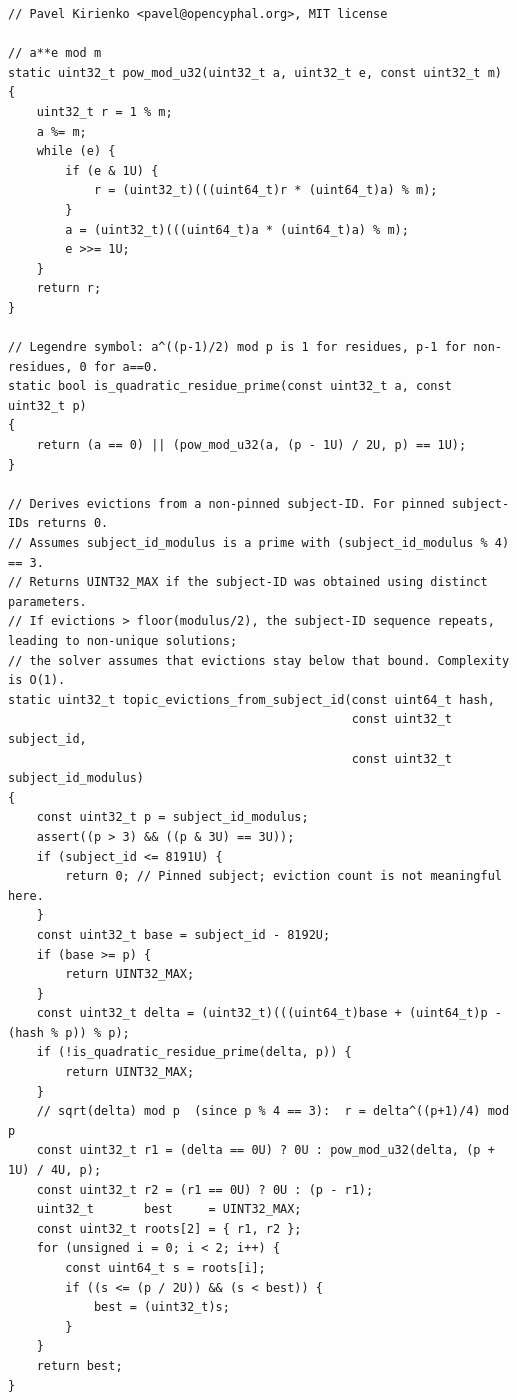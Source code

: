\begin{verbatim}
// Pavel Kirienko <pavel@opencyphal.org>, MIT license

// a**e mod m
static uint32_t pow_mod_u32(uint32_t a, uint32_t e, const uint32_t m)
{
    uint32_t r = 1 % m;
    a %= m;
    while (e) {
        if (e & 1U) {
            r = (uint32_t)(((uint64_t)r * (uint64_t)a) % m);
        }
        a = (uint32_t)(((uint64_t)a * (uint64_t)a) % m);
        e >>= 1U;
    }
    return r;
}

// Legendre symbol: a^((p-1)/2) mod p is 1 for residues, p-1 for non-residues, 0 for a==0.
static bool is_quadratic_residue_prime(const uint32_t a, const uint32_t p)
{
    return (a == 0) || (pow_mod_u32(a, (p - 1U) / 2U, p) == 1U);
}

// Derives evictions from a non-pinned subject-ID. For pinned subject-IDs returns 0.
// Assumes subject_id_modulus is a prime with (subject_id_modulus % 4) == 3.
// Returns UINT32_MAX if the subject-ID was obtained using distinct parameters.
// If evictions > floor(modulus/2), the subject-ID sequence repeats, leading to non-unique solutions;
// the solver assumes that evictions stay below that bound. Complexity is O(1).
static uint32_t topic_evictions_from_subject_id(const uint64_t hash,
                                                const uint32_t subject_id,
                                                const uint32_t subject_id_modulus)
{
    const uint32_t p = subject_id_modulus;
    assert((p > 3) && ((p & 3U) == 3U));
    if (subject_id <= 8191U) {
        return 0; // Pinned subject; eviction count is not meaningful here.
    }
    const uint32_t base = subject_id - 8192U;
    if (base >= p) {
        return UINT32_MAX;
    }
    const uint32_t delta = (uint32_t)(((uint64_t)base + (uint64_t)p - (hash % p)) % p);
    if (!is_quadratic_residue_prime(delta, p)) {
        return UINT32_MAX;
    }
    // sqrt(delta) mod p  (since p % 4 == 3):  r = delta^((p+1)/4) mod p
    const uint32_t r1 = (delta == 0U) ? 0U : pow_mod_u32(delta, (p + 1U) / 4U, p);
    const uint32_t r2 = (r1 == 0U) ? 0U : (p - r1);
    uint32_t       best     = UINT32_MAX;
    const uint32_t roots[2] = { r1, r2 };
    for (unsigned i = 0; i < 2; i++) {
        const uint64_t s = roots[i];
        if ((s <= (p / 2U)) && (s < best)) {
            best = (uint32_t)s;
        }
    }
    return best;
}
\end{verbatim}
